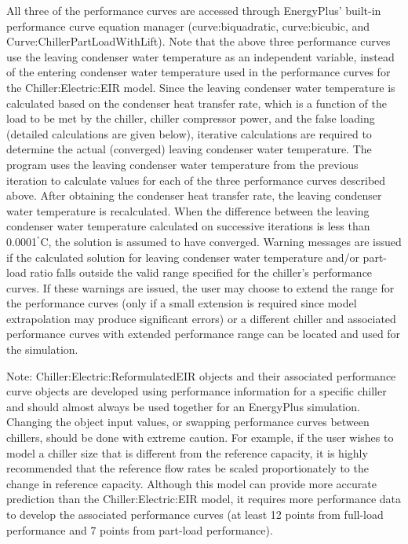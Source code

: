 All three of the performance curves are accessed through EnergyPlus' built-in performance curve equation manager (curve:biquadratic, curve:bicubic, and Curve:ChillerPartLoadWithLift). Note that the above three performance curves use the leaving condenser water temperature as an independent variable, instead of the entering condenser water temperature used in the performance curves for the Chiller:Electric:EIR model. Since the leaving condenser water temperature is calculated based on the condenser heat transfer rate, which is a function of the load to be met by the chiller, chiller compressor power, and the false loading (detailed calculations are given below), iterative calculations are required to determine the actual (converged) leaving condenser water temperature. The program uses the leaving condenser water temperature from the previous iteration to calculate values for each of the three performance curves described above. After obtaining the condenser heat transfer rate, the leaving condenser water temperature is recalculated. When the difference between the leaving condenser water temperature calculated on successive iterations is less than 0.0001\(^{°}\)C, the solution is assumed to have converged. Warning messages are issued if the calculated solution for leaving condenser water temperature and/or part-load ratio falls outside the valid range specified for the chiller's performance curves. If these warnings are issued, the user may choose to extend the range for the performance curves (only if a small extension is required since model extrapolation may produce significant errors) or a different chiller and associated performance curves with extended performance range can be located and used for the simulation.

Note: Chiller:Electric:ReformulatedEIR objects and their associated performance curve objects are developed using performance information for a specific chiller and should almost always be used together for an EnergyPlus simulation. Changing the object input values, or swapping performance curves between chillers, should be done with extreme caution. For example, if the user wishes to model a chiller size that is different from the reference capacity, it is highly recommended that the reference flow rates be scaled proportionately to the change in reference capacity. Although this model can provide more accurate prediction than the Chiller:Electric:EIR model, it requires more performance data to develop the associated performance curves (at least 12 points from full-load performance and 7 points from part-load performance).

